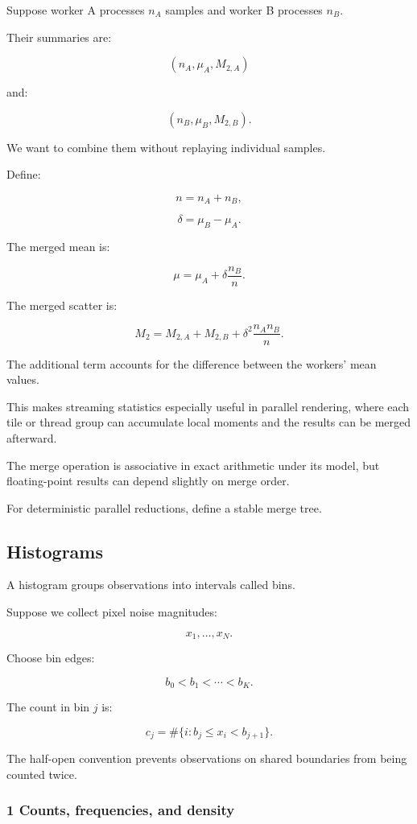 Suppose worker A processes \(n_A\) samples and worker B processes \(n_B\).

Their summaries are:

\[
 (n_A,\mu_A,M_{2,A})
\]

and:

\[
 (n_B,\mu_B,M_{2,B}).
\]

We want to combine them without replaying individual samples.

Define:

\[
 n=n_A+n_B,
\]

\[
 \delta=\mu_B-\mu_A.
\]

The merged mean is:

\[
 \boxed{ \mu= \mu_A+\delta\frac{n_B}{n} }.
\]

The merged scatter is:

\[
 \boxed{ M_2= M_{2,A}+M_{2,B} + \delta^2\frac{n_An_B}{n} }.
\]

The additional term accounts for the difference between the workers' mean values.

This makes streaming statistics especially useful in parallel rendering, where each tile or thread group can accumulate local moments and the results can be merged afterward.

The merge operation is associative in exact arithmetic under its model, but floating-point results can depend slightly on merge order.

For deterministic parallel reductions, define a stable merge tree.

\subsection{Histograms}\label{02-foundations-ii-ch030-histograms}

A histogram groups observations into intervals called bins.

Suppose we collect pixel noise magnitudes:

\[
 x_1,\ldots,x_N.
\]

Choose bin edges:

\[
 b_0<b_1<\cdots<b_K.
\]

The count in bin \(j\) is:

\[
 \boxed{ c_j= \#\{i:b_j\le x_i < b_{j+1}\} }.
\]

The half-open convention prevents observations on shared boundaries from being counted twice.

\subsubsection{1 Counts, frequencies, and density}\label{02-foundations-ii-ch030-counts-frequencies-and-density}

